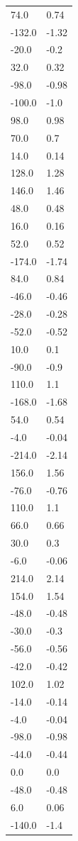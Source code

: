 \begin{longtable}{ll}
74.0 & 0.74 \\
-132.0 & -1.32 \\
-20.0 & -0.2 \\
32.0 & 0.32 \\
-98.0 & -0.98 \\
-100.0 & -1.0 \\
98.0 & 0.98 \\
70.0 & 0.7 \\
14.0 & 0.14 \\
128.0 & 1.28 \\
146.0 & 1.46 \\
48.0 & 0.48 \\
16.0 & 0.16 \\
52.0 & 0.52 \\
-174.0 & -1.74 \\
84.0 & 0.84 \\
-46.0 & -0.46 \\
-28.0 & -0.28 \\
-52.0 & -0.52 \\
10.0 & 0.1 \\
-90.0 & -0.9 \\
110.0 & 1.1 \\
-168.0 & -1.68 \\
54.0 & 0.54 \\
-4.0 & -0.04 \\
-214.0 & -2.14 \\
156.0 & 1.56 \\
-76.0 & -0.76 \\
110.0 & 1.1 \\
66.0 & 0.66 \\
30.0 & 0.3 \\
-6.0 & -0.06 \\
214.0 & 2.14 \\
154.0 & 1.54 \\
-48.0 & -0.48 \\
-30.0 & -0.3 \\
-56.0 & -0.56 \\
-42.0 & -0.42 \\
102.0 & 1.02 \\
-14.0 & -0.14 \\
-4.0 & -0.04 \\
-98.0 & -0.98 \\
-44.0 & -0.44 \\
0.0 & 0.0 \\
-48.0 & -0.48 \\
6.0 & 0.06 \\
-140.0 & -1.4 \\

\end{longtable}
